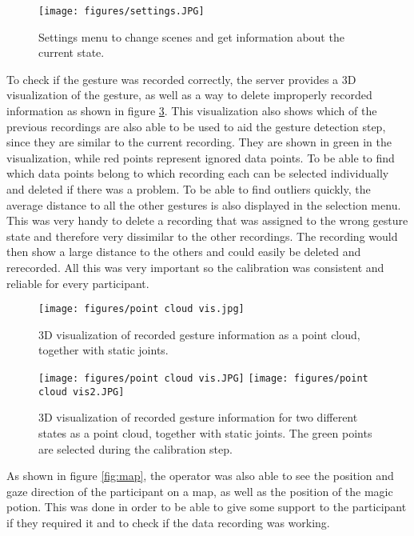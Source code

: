 \begin{figure}[!ht]
    \centering
    \texttt{[image: figures/settings.JPG]}
    \caption{Settings menu to change scenes and get information about the current state.}
    \label{fig:settings}
\end{figure}

To check if the gesture was recorded correctly, the server provides a 3D visualization of the gesture, as well as a way to delete improperly recorded information as shown in figure \ref{fig:vis}. This visualization also shows which of the previous recordings are also able to be used to aid the gesture detection step, since they are similar to the current recording. They are shown in green in the visualization, while red points represent ignored data points. To be able to find which data points belong to which recording each can be selected individually and deleted if there was a problem. To be able to find outliers quickly, the average distance to all the other gestures is also displayed in the selection menu. This was very handy to delete a recording that was assigned to the wrong gesture state and therefore very dissimilar to the other recordings. The recording would then show a large distance to the others and could easily be deleted and rerecorded. All this was very important so the calibration was consistent and reliable for every participant.

\begin{figure}[!ht]
    \centering
    \texttt{[image: figures/point cloud vis.jpg]}
    \caption{3D visualization of recorded gesture information as a point cloud, together with static joints.}
    \label{fig:vis}
\end{figure}
\begin{figure}[!htb]
        \texttt{[image: figures/point cloud vis.JPG]}
    \endminipage\hfill
        \texttt{[image: figures/point cloud vis2.JPG]}
        \label{fig:vis}
    \endminipage\hfill
    \caption{3D visualization of recorded gesture information for two different states as a point cloud, together with static joints. The green points are selected during the calibration step.}
\end{figure}

As shown in figure \ref{fig:map}, the operator was also able to see the position and gaze direction of the participant on a map, as well as the position of the magic potion. This was done in order to be able to give some support to the participant if they required it and to check if the data recording was working. 

